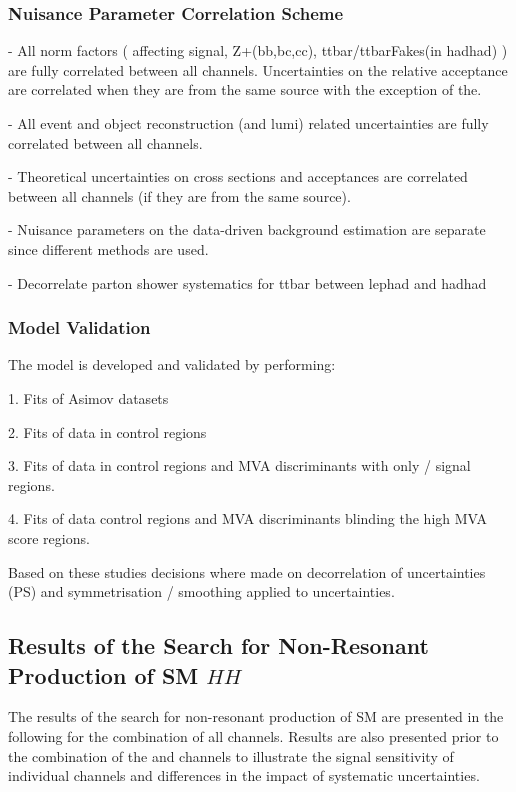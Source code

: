 \subsubsection{Nuisance Parameter Correlation Scheme}

- All norm factors ( affecting signal, Z+(bb,bc,cc),
ttbar/ttbarFakes(in hadhad) ) are fully correlated between all
channels. Uncertainties on the relative acceptance are correlated when
they are from the same source with the exception of the.

- All event and object reconstruction (and lumi) related uncertainties
are fully correlated between all channels.

- Theoretical uncertainties on cross sections and acceptances are
correlated between all channels (if they are from the same source).

- Nuisance parameters on the data-driven background estimation are
separate since different methods are used.

- Decorrelate parton shower systematics for ttbar between lephad and
hadhad


\subsubsection{Model Validation}

The model is developed and validated by performing:

1. Fits of Asimov datasets

2. Fits of data in control regions

3. Fits of data in control regions and MVA discriminants with only
\hadhad / \lephad signal regions.

4. Fits of data control regions and MVA discriminants blinding the
high MVA score regions.

Based on these studies decisions where made on decorrelation of
uncertainties (PS) and symmetrisation / smoothing applied to
uncertainties.


\subsection{Results of the Search for Non-Resonant Production of SM $HH$}
\label{sec:results_nonres}

The results of the search for non-resonant production of SM \HH are
presented in the following for the combination of all
channels. Results are also presented prior to the combination of the
\hadhad and \lephad channels to illustrate the signal sensitivity of
individual channels and differences in the impact of systematic
uncertainties.

